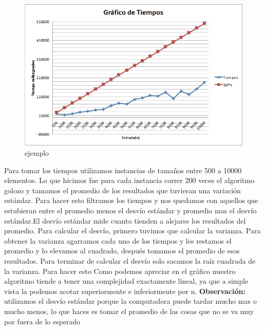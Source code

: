 \begin{figure}[htb]
  \begin{center}
      \includegraphics[scale=0.75]{imagenes/GraficoEj1.jpg}
  \end{center}
  \caption{ejemplo}
\end{figure}


Para tomar los tiempos utilizamos instancias de tamaños entre 500 a 10000 elementos. 
Lo que hicimos fue para cada instancia correr 200 veces el algoritmo golozo y tamamos el promedio de los resultados que tuvieran una variación estándar.
Para hacer esto filtramos los tiempos y nos quedamos con aquellos que estubieran entre el promedio menos el desvío estándar y promedio mas el desvío estándar.El desvío estándar mide cuanto tienden a alejarse los resultados del promedio. Para calcular el desvío, primero tuvimos que calcular la varianza. Para obtener la varianza agarramos cada uno de los tiempos y  les restamos el promedio y lo elevamos al cuadrado, después tomamos el promedio de esos resultados. Para terminar de calcular el desvío solo sacamos la raíz cuadrada de la varianza. Para hacer esto
\newline
Como podemos apreciar en el gráfico nuestro  algoritmo tiende a tener una complejidad exactamente lineal, ya que a simple vista la podemos acotar superiormente e inferiormente por n. \newline
\textbf{Observación: } utilizamos el desvío estándar porque la computadora puede tardar mucho mas o mucho menos, lo que haces es tomar el promedio de las cosas que no se va muy por fuera de lo esperado
	








